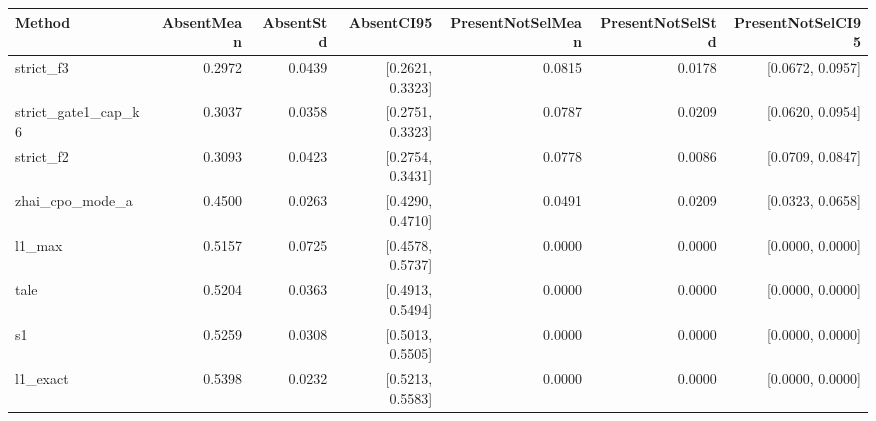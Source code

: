 \begin{tabular}{lrrrrrr}
\hline
Method & AbsentMean & AbsentStd & AbsentCI95 & PresentNotSelMean & PresentNotSelStd & PresentNotSelCI95 \\
\hline
strict_f3 & 0.2972 & 0.0439 & [0.2621, 0.3323] & 0.0815 & 0.0178 & [0.0672, 0.0957] \\
strict_gate1_cap_k6 & 0.3037 & 0.0358 & [0.2751, 0.3323] & 0.0787 & 0.0209 & [0.0620, 0.0954] \\
strict_f2 & 0.3093 & 0.0423 & [0.2754, 0.3431] & 0.0778 & 0.0086 & [0.0709, 0.0847] \\
zhai_cpo_mode_a & 0.4500 & 0.0263 & [0.4290, 0.4710] & 0.0491 & 0.0209 & [0.0323, 0.0658] \\
l1_max & 0.5157 & 0.0725 & [0.4578, 0.5737] & 0.0000 & 0.0000 & [0.0000, 0.0000] \\
tale & 0.5204 & 0.0363 & [0.4913, 0.5494] & 0.0000 & 0.0000 & [0.0000, 0.0000] \\
s1 & 0.5259 & 0.0308 & [0.5013, 0.5505] & 0.0000 & 0.0000 & [0.0000, 0.0000] \\
l1_exact & 0.5398 & 0.0232 & [0.5213, 0.5583] & 0.0000 & 0.0000 & [0.0000, 0.0000] \\
\hline
\end{tabular}

